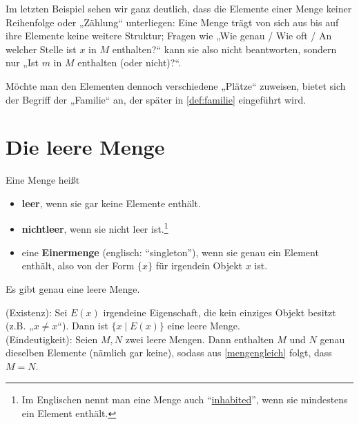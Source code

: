 \begin{bem} \label{mengenstrukturlos}
    Im letzten Beispiel sehen wir ganz deutlich, dass die Elemente einer Menge keiner Reihenfolge oder „Zählung“ unterliegen: Eine Menge trägt von sich aus bis auf ihre Elemente keine weitere Struktur; Fragen wie „Wie genau / Wie oft / An welcher Stelle ist $x$ in $M$ enthalten?“ kann sie also nicht beantworten, sondern nur „Ist $m$ in $M$ enthalten (oder nicht)?“.
    
    Möchte man den Elementen dennoch verschiedene „Plätze“ zuweisen, bietet sich der Begriff der „Familie“ an, der später in \cref{def:familie} eingeführt wird.
\end{bem}





\section{Die leere Menge}


\begin{de}  
    Eine Menge heißt
    \begin{itemize}
        \item \textbf{leer}, wenn sie gar keine Elemente enthält.
        \item \textbf{nichtleer}, wenn sie nicht leer ist.\footnote{Im Englischen nennt man eine Menge auch ``\href{https://en.wikipedia.org/wiki/Inhabited_set}{inhabited}'', wenn sie mindestens ein Element enthält.}
        \item eine \textbf{Einermenge} (englisch: ``singleton''), wenn sie genau ein Element enthält, also von der Form $\{x\}$ für irgendein Objekt $x$ ist.
    \end{itemize}
\end{de}


\begin{satz} \label{leeremengeeind}
    Es gibt genau eine leere Menge.
\end{satz}


\begin{bew}
    (Existenz): Sei $E(x)$ irgendeine Eigenschaft, die kein einziges Objekt besitzt (z.B. „$x\neq x$“). Dann ist $\{ x\mid E(x) \}$ eine leere Menge. \\[0.5em]
    (Eindeutigkeit): Seien $M,N$ zwei leere Mengen. Dann enthalten $M$ und $N$ genau dieselben Elemente (nämlich gar keine), sodass aus \cref{mengengleich} folgt, dass $M=N$.
\end{bew}


